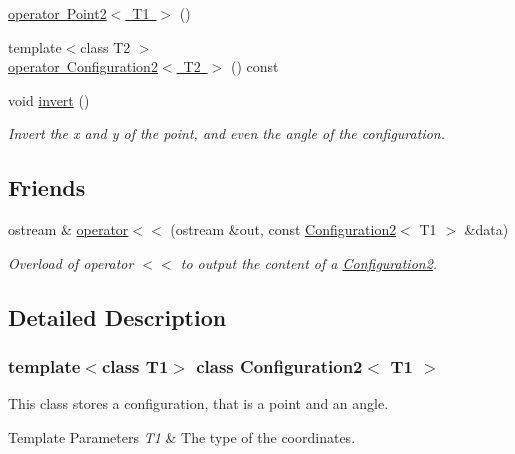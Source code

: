 \begin{DoxyCompactItemize}
\mbox{\hyperlink{class_configuration2_a8f9c571c4438c591dbafbd76eda85a0e}{operator Point2$<$ T1 $>$}} ()
\item 
{\footnotesize template$<$class T2 $>$ }\\\mbox{\hyperlink{class_configuration2_a3bc8dfea259f6d3f97f6770c09ff6526}{operator Configuration2$<$ T2 $>$}} () const
\item 
void \mbox{\hyperlink{class_configuration2_a0a63aa5b2089b11bf0f6ec9c65560e56}{invert}} ()
\begin{DoxyCompactList}\small\item\em Invert the x and y of the point, and even the angle of the configuration. \end{DoxyCompactList}\end{DoxyCompactItemize}
\subsection*{Friends}
\begin{DoxyCompactItemize}
\item 
ostream \& \mbox{\hyperlink{class_configuration2_a90aec83947c9087504b4a9b6f0db8205}{operator$<$$<$}} (ostream \&out, const \mbox{\hyperlink{class_configuration2}{Configuration2}}$<$ T1 $>$ \&data)
\begin{DoxyCompactList}\small\item\em Overload of operator $<$$<$ to output the content of a {\ttfamily \mbox{\hyperlink{class_configuration2}{Configuration2}}}. \end{DoxyCompactList}\end{DoxyCompactItemize}


\subsection{Detailed Description}
\subsubsection*{template$<$class T1$>$\newline
class Configuration2$<$ T1 $>$}

This class stores a configuration, that is a point and an angle. 


\begin{DoxyTemplParams}{Template Parameters}
{\em T1} & The type of the coordinates. \\
\hline
\end{DoxyTemplParams}


